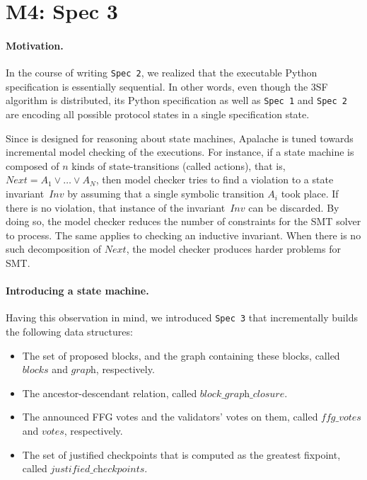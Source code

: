 
\section{M4: Spec 3}

\paragraph{Motivation.} In the course of writing \texttt{Spec 2}, we realized
that the executable Python specification is essentially sequential. In other
words, even though the 3SF algorithm is distributed, its Python
specification as well as \texttt{Spec 1} and \texttt{Spec 2} are encoding
all possible protocol states in a single specification state.

Since \tlap{} is designed for reasoning about state machines, Apalache is tuned
towards incremental model checking of the executions. For instance, if a state
machine is composed of $n$ kinds of state-transitions (called actions), that
is, $\mathit{Next} = A_1 \vee \dots \vee A_N$, then model checker tries to find
a violation to a state invariant~$\textit{Inv}$ by assuming that a single
symbolic transition $A_i$ took place. If there is no violation, that instance
of the invariant~$\textit{Inv}$ can be discarded. By doing so, the model
checker reduces the number of constraints for the SMT solver to process.  The
same applies to checking an inductive invariant. When there is no such
decomposition of $\mathit{Next}$, the model checker produces harder problems
for SMT\@.

\paragraph{Introducing a state machine.} Having this observation in mind, we
introduced \texttt{Spec 3} that incrementally builds the following data structures:

\begin{itemize}

    \item The set of proposed blocks, and the graph containing these blocks,
        called $\textit{blocks}$ and $\textit{graph}$, respectively.

    \item The ancestor-descendant relation, called
        $\textit{block\_graph\_closure}$.

    \item The announced FFG votes and the validators' votes on them, called
        $\textit{ffg\_votes}$ and $\textit{votes}$, respectively.

    \item The set of justified checkpoints that is computed as the greatest
        fixpoint, called $\textit{justified\_checkpoints}$.

\end{itemize}


